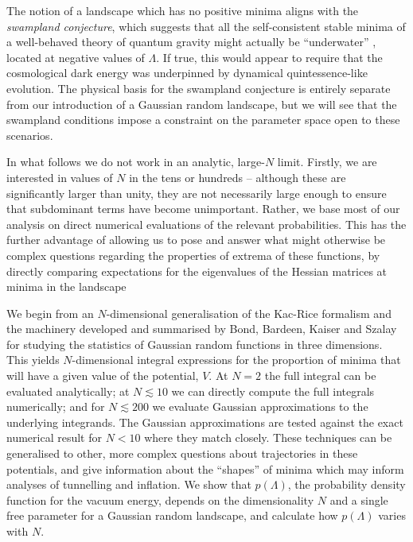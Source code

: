 \documentclass[12pt]{article}
\begin{document}
The notion of a landscape which has no positive minima aligns with the \emph{swampland conjecture}, which suggests that all the self-consistent stable minima of a well-behaved theory of quantum gravity might actually be ``underwater'' \cite{Agrawal2018},  located at negative values of $\Lambda$. If true, this would appear to require that the cosmological dark energy was underpinned by dynamical quintessence-like evolution.  The physical basis for the swampland conjecture is entirely separate from our introduction of a Gaussian random landscape, but we will see that the swampland conditions impose a constraint on the parameter space open to these scenarios.  

In what follows we do not work in an analytic, large-$N$ limit. Firstly, we are interested in values of $N$ in the tens or hundreds -- although these are significantly larger than unity, they are not necessarily large enough to ensure that subdominant terms have become unimportant. Rather, we base most of our analysis on direct numerical evaluations of the relevant probabilities.  This has the further advantage of allowing us to pose and answer what might otherwise be complex questions regarding the properties of extrema of these functions, by directly comparing expectations for the eigenvalues of the Hessian matrices at minima in the landscape  
 
 We begin from an $N$-dimensional generalisation of the Kac-Rice formalism \cite{Kac1943,Rice1945} and the  machinery developed and summarised by Bond, Bardeen, Kaiser and Szalay  \cite{BBKS} for studying the statistics of Gaussian random functions in three dimensions. This yields $N$-dimensional integral expressions for the proportion of minima that will have a given value of the potential, $V$. At $N=2$ the full integral can be evaluated analytically; at $N \lesssim 10$ we can directly compute the full integrals numerically; and for $N \lesssim 200$ we evaluate Gaussian approximations to the underlying integrands. The Gaussian approximations are tested against the exact numerical result for $N <10$ where they match closely. These techniques can be generalised to other, more complex questions about trajectories in these potentials, and give information about the ``shapes'' of minima which may inform analyses of tunnelling and inflation. We show that $p(\Lambda)$, the probability density function for the vacuum energy, depends on the dimensionality $N$ and a single free parameter for a Gaussian random landscape, and calculate how $p(\Lambda)$ varies with $N$. 
 
\end{document}
